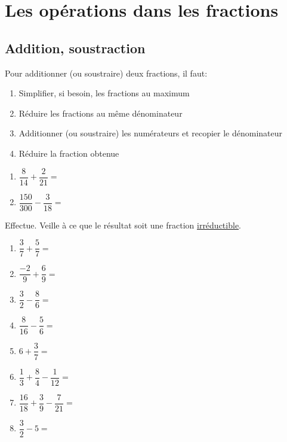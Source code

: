 \documentclass[../../syllabus_2.tex]{subfiles}
\begin{document}
\chapter{Les opérations dans les fractions}

\section{Addition, soustraction}

Pour additionner (ou soustraire) deux fractions, il faut:
\begin{enumerate}[]
  \item Simplifier, si besoin, les fractions au maximum
  \item Réduire les fractions au même dénominateur
  \item Additionner (ou soustraire) les numérateurs et recopier le dénominateur
  \item Réduire la fraction obtenue
\end{enumerate}

\exemple 
\begin{enumerate}[cols=2]
  \item $\dfrac{8}{14} + \dfrac{2}{21}=$
  \item $\dfrac{150}{300} - \dfrac{3}{18}=$
\end{enumerate}
\vspace*{3cm} 

\newpage

\begin{exercise}
  Effectue. Veille à ce que le résultat soit une fraction \underline{irréductible}.

  \begin{enumerate}[cols=2, itemsep=3cm]
    \item $\dfrac{3}{7} + \dfrac{5}{7}=$
    \item $\dfrac{-2}{9} + \dfrac{6}{9}=$
    \item $\dfrac{3}{2} - \dfrac{8}{6}=$
    \item $\dfrac{8}{16} - \dfrac{5}{6}=$
    \item $6 + \dfrac{3}{7}=$
    \item $\dfrac{1}{3} + \dfrac{8}{4} - \dfrac{1}{12}=$
    \item $\dfrac{16}{18} + \dfrac{3}{9} - \dfrac{7}{21}=$
    \item $\dfrac{3}{2} - 5=$
  \end{enumerate}
  \vspace*{3cm}
\end{exercise}
\end{document}
